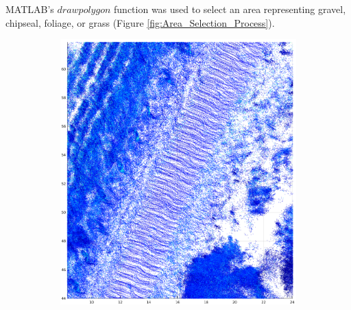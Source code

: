 \documentclass[numbered,pdftex]{ohio-etd}
\begin{document}
{{{{				{MATLAB's $drawpolygon$ function was used to select an area representing gravel, chipseal, foliage, or grass (Figure \ref{fig:Area_Selection_Process}).}
	
				\begin{figure}[H]
					\centering
					\begin{subfigure}{0.45\textwidth}
						\centering
						\includegraphics[width=1.0\linewidth]{Defense_Images/pre_select_area}
						\caption[Bean Hollow Road Satellite View]{}
						\label{fig:pre_select_area}
					\end{subfigure}
					\begin{subfigure}{0.45\textwidth}
						\centering

\end{subfigure}
\end{figure}}}}}
\end{document}
